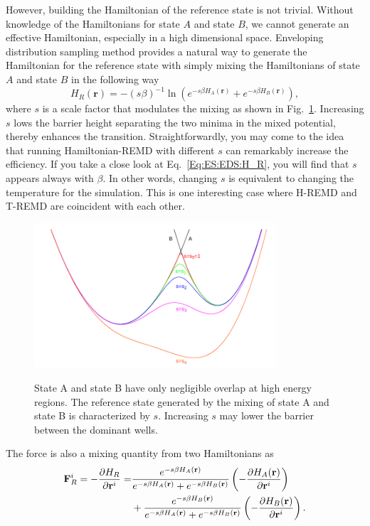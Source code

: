However, building the Hamiltonian of the reference state is not trivial. Without knowledge of the Hamiltonians for state $A$ and state $B$, we cannot generate an effective Hamiltonian,
especially in a high dimensional space. Enveloping distribution sampling method provides a natural way to generate the Hamiltonian for the reference state with simply mixing the Hamiltonians of state $A$ and state $B$ in the following way
\begin{equation}
	H_R(\mathbf{r})=-\left(s\beta\right)^{-1}\ln{\left(e^{-s\beta H_A(\mathbf{r})}+e^{-s\beta H_B(\mathbf{r})}\right)},
	\label{Eq:ES:EDS:H_R}
\end{equation}
where $s$ is a scale factor that modulates the mixing\cite{ChristJCTC2009} as shown in Fig.~\ref{Fig:ES:EDS}. Increasing $s$ lows the barrier height separating the two minima in the mixed potential, thereby enhances the transition. Straightforwardly, you may come to the idea that running Hamiltonian-REMD with different $s$ can remarkably increase the efficiency.
If you take a close look at Eq.~\ref{Eq:ES:EDS:H_R}, you will find that $s$ appears always with $\beta$. In other words, changing $s$ is equivalent to changing the temperature for the simulation. This is one interesting case where H-REMD and T-REMD are coincident with each other. 
\begin{figure}[htbp]
	\centering
	\includegraphics[width=0.8\textwidth]{figures/EDS.pdf}\\
	\caption{State A and state B have only negligible overlap at high energy regions. The reference state generated by the mixing of state A and state B is characterized by $s$. Increasing $s$ may lower the barrier between the dominant wells.}\label{Fig:ES:EDS}
\end{figure}

The force is also a mixing quantity from two Hamiltonians as
\begin{align}
	\mathbf{F}_R^i=-\frac{\partial H_R}{\partial \mathbf{r}^i}=&\frac{e^{-s\beta H_A(\mathbf{r})}}{e^{-s\beta H_A(\mathbf{r})}+e^{-s\beta H_B(\mathbf{r})}}\left(-\frac{\partial H_A(\mathbf{r})}{\partial \mathbf{r}^i}\right)\notag\\
	&+\frac{e^{-s\beta H_B(\mathbf{r})}}{e^{-s\beta H_A(\mathbf{r})}+e^{-s\beta H_B(\mathbf{r})}}\left(-\frac{\partial H_B(\mathbf{r})}{\partial \mathbf{r}^i}\right).
\end{align}
